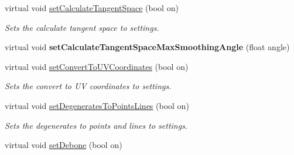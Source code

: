 \begin{DoxyCompactItemize}
virtual void \hyperlink{classrepo_1_1manipulator_1_1modelconvertor_1_1_model_import_config_ac455657cd5edd144eaf9dcb09102b454}{set\+Calculate\+Tangent\+Space} (bool on)
\begin{DoxyCompactList}\small\item\em Sets the calculate tangent space to settings. \end{DoxyCompactList}\item 
\hypertarget{classrepo_1_1manipulator_1_1modelconvertor_1_1_model_import_config_adbf3ed127e6f943cfea572f1e4665564}{}virtual void {\bfseries set\+Calculate\+Tangent\+Space\+Max\+Smoothing\+Angle} (float angle)\label{classrepo_1_1manipulator_1_1modelconvertor_1_1_model_import_config_adbf3ed127e6f943cfea572f1e4665564}

\item 
\hypertarget{classrepo_1_1manipulator_1_1modelconvertor_1_1_model_import_config_a727eef45aac92dd9b113fd90ab1f51f5}{}virtual void \hyperlink{classrepo_1_1manipulator_1_1modelconvertor_1_1_model_import_config_a727eef45aac92dd9b113fd90ab1f51f5}{set\+Convert\+To\+U\+V\+Coordinates} (bool on)\label{classrepo_1_1manipulator_1_1modelconvertor_1_1_model_import_config_a727eef45aac92dd9b113fd90ab1f51f5}

\begin{DoxyCompactList}\small\item\em Sets the convert to U\+V coordinates to settings. \end{DoxyCompactList}\item 
\hypertarget{classrepo_1_1manipulator_1_1modelconvertor_1_1_model_import_config_ab058a8b1765a41295891b12c71ef6e9f}{}virtual void \hyperlink{classrepo_1_1manipulator_1_1modelconvertor_1_1_model_import_config_ab058a8b1765a41295891b12c71ef6e9f}{set\+Degenerates\+To\+Points\+Lines} (bool on)\label{classrepo_1_1manipulator_1_1modelconvertor_1_1_model_import_config_ab058a8b1765a41295891b12c71ef6e9f}

\begin{DoxyCompactList}\small\item\em Sets the degenerates to points and lines to settings. \end{DoxyCompactList}\item 
\hypertarget{classrepo_1_1manipulator_1_1modelconvertor_1_1_model_import_config_a647cfa99fdbbf8669e8ae58184d66d99}{}virtual void \hyperlink{classrepo_1_1manipulator_1_1modelconvertor_1_1_model_import_config_a647cfa99fdbbf8669e8ae58184d66d99}{set\+Debone} (bool on)\label{classrepo_1_1manipulator_1_1modelconvertor_1_1_model_import_config_a647cfa99fdbbf8669e8ae58184d66d99}


\end{DoxyCompactItemize}
